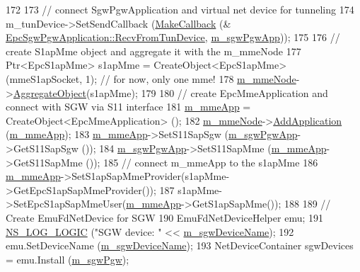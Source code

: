 \begin{DoxyCode}
172   
173   \textcolor{comment}{// connect SgwPgwApplication and virtual net device for tunneling}
174   m\_tunDevice->SetSendCallback (\hyperlink{group__makecallbackmemptr_ga9376283685aa99d204048d6a4b7610a4}{MakeCallback} (&
      \hyperlink{classns3_1_1EpcSgwPgwApplication_aeea285ccd04a4350e4ddb77a359e97ca}{EpcSgwPgwApplication::RecvFromTunDevice}, 
      \hyperlink{classns3_1_1EmuEpcHelper_a9f3619ec9e8725d4fbb9794a4f21aaa4}{m\_sgwPgwApp}));
175 
176   \textcolor{comment}{// create S1apMme object and aggregate it with the m\_mmeNode}
177   Ptr<EpcS1apMme> s1apMme = CreateObject<EpcS1apMme> (mmeS1apSocket, 1); \textcolor{comment}{// for now, only one mme!}
178   \hyperlink{classns3_1_1EmuEpcHelper_aef136870f0ad1c40d3e139f34ff9f5d1}{m\_mmeNode}->\hyperlink{classns3_1_1Object_a79dd435d300f3deca814553f561a2922}{AggregateObject}(s1apMme);
179 
180   \textcolor{comment}{// create EpcMmeApplication and connect with SGW via S11 interface}
181   \hyperlink{classns3_1_1EmuEpcHelper_a20264a8bd8b295161b08d09e4794f02f}{m\_mmeApp} = CreateObject<EpcMmeApplication> ();
182   \hyperlink{classns3_1_1EmuEpcHelper_aef136870f0ad1c40d3e139f34ff9f5d1}{m\_mmeNode}->\hyperlink{classns3_1_1Node_ab98b4fdc4aadc86366b80e8a79a53f47}{AddApplication} (\hyperlink{classns3_1_1EmuEpcHelper_a20264a8bd8b295161b08d09e4794f02f}{m\_mmeApp});
183   \hyperlink{classns3_1_1EmuEpcHelper_a20264a8bd8b295161b08d09e4794f02f}{m\_mmeApp}->SetS11SapSgw (\hyperlink{classns3_1_1EmuEpcHelper_a9f3619ec9e8725d4fbb9794a4f21aaa4}{m\_sgwPgwApp}->GetS11SapSgw ());
184   \hyperlink{classns3_1_1EmuEpcHelper_a9f3619ec9e8725d4fbb9794a4f21aaa4}{m\_sgwPgwApp}->SetS11SapMme (\hyperlink{classns3_1_1EmuEpcHelper_a20264a8bd8b295161b08d09e4794f02f}{m\_mmeApp}->GetS11SapMme ());
185   \textcolor{comment}{// connect m\_mmeApp to the s1apMme}
186   \hyperlink{classns3_1_1EmuEpcHelper_a20264a8bd8b295161b08d09e4794f02f}{m\_mmeApp}->SetS1apSapMmeProvider(s1apMme->GetEpcS1apSapMmeProvider());
187   s1apMme->SetEpcS1apSapMmeUser(\hyperlink{classns3_1_1EmuEpcHelper_a20264a8bd8b295161b08d09e4794f02f}{m\_mmeApp}->GetS1apSapMme());
188 
189   \textcolor{comment}{// Create EmuFdNetDevice for SGW}
190   EmuFdNetDeviceHelper emu;
191   \hyperlink{group__logging_ga88acd260151caf2db9c0fc84997f45ce}{NS\_LOG\_LOGIC} (\textcolor{stringliteral}{"SGW device: "} << \hyperlink{classns3_1_1EmuEpcHelper_aaf7c6410b27ea82a8fabc136801bf0d4}{m\_sgwDeviceName});
192   emu.SetDeviceName (\hyperlink{classns3_1_1EmuEpcHelper_aaf7c6410b27ea82a8fabc136801bf0d4}{m\_sgwDeviceName});
193   NetDeviceContainer sgwDevices = emu.Install (\hyperlink{classns3_1_1EmuEpcHelper_a5c68f673b82b8c80b5fb88ae986f8cea}{m\_sgwPgw});

\end{DoxyCode}
